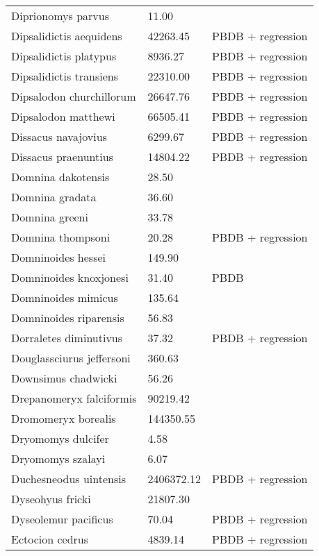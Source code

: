 \documentclass{article}
\begin{document}
\begin{center}
\begin{longtable}{p{} p{} p{}}
    Diprionomys parvus & 11.00 & \cite{McKenna2011} \\ 
    Dipsalidictis aequidens & 42263.45 & PBDB + regression \\ 
    Dipsalidictis platypus & 8936.27 & PBDB + regression \\ 
    Dipsalidictis transiens & 22310.00 & PBDB + regression \\ 
    Dipsalodon churchillorum & 26647.76 & PBDB + regression \\ 
    Dipsalodon matthewi & 66505.41 & PBDB + regression \\ 
    Dissacus navajovius & 6299.67 & PBDB + regression \\ 
    Dissacus praenuntius & 14804.22 & PBDB + regression \\ 
    Domnina dakotensis & 28.50 & \cite{Tomiya2013} \\ 
    Domnina gradata & 36.60 & \cite{Tomiya2013} \\ 
    Domnina greeni & 33.78 & \cite{Tomiya2013} \\ 
    Domnina thompsoni & 20.28 & PBDB + regression \\ 
    Domninoides hessei & 149.90 & \cite{Tomiya2013} \\ 
    Domninoides knoxjonesi & 31.40 & PBDB \\ 
    Domninoides mimicus & 135.64 & \cite{Tomiya2013} \\ 
    Domninoides riparensis & 56.83 & \cite{Tomiya2013} \\ 
    Dorraletes diminutivus & 37.32 & PBDB + regression \\ 
    Douglassciurus jeffersoni & 360.63 & \cite{Mihlbachler2006} \\ 
    Downsimus chadwicki & 56.26 & \cite{Tomiya2013} \\ 
    Drepanomeryx falciformis & 90219.42 & \cite{Tomiya2013} \\ 
    Dromomeryx borealis & 144350.55 & \cite{Tomiya2013} \\ 
    Dryomomys dulcifer & 4.58 & \cite{Novacek1977} \\ 
    Dryomomys szalayi & 6.07 & \cite{Novacek1977} \\ 
    Duchesneodus uintensis & 2406372.12 & PBDB + regression \\ 
    Dyseohyus fricki & 21807.30 & \cite{Tomiya2013} \\ 
    Dyseolemur pacificus & 70.04 & PBDB + regression \\ 
    Ectocion cedrus & 4839.14 & PBDB + regression \\ 

\end{longtable}
\end{center}
\end{document}
